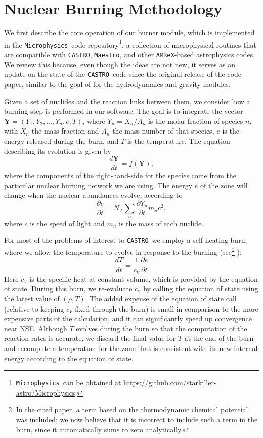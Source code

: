 \documentclass[twocolumn,numberedappendix]{../aastex62}
\newcommand{\amrex}{\texttt{AMReX}}
\newcommand{\castro}{\texttt{CASTRO}}
\newcommand{\maestro}{\texttt{Maestro}}
\newcommand{\microphysics}{\texttt{Microphysics}}
\begin{document}
\section{Nuclear Burning Methodology}
\label{sec:burner}

We first describe the core operation of our burner module, which is implemented in
the \microphysics\ code repository\footnote{\microphysics\ can be obtained at
  \url{https://github.com/starkiller-astro/Microphysics}.}, a collection of microphysical
routines that are compatible with \castro, \maestro, and other \amrex-based astrophysics
codes. We review this because, even though the ideas are not new,
it serves as an update on the state of the \castro\ code since the original release of
the code paper, similar to the goal of \cite{wdmergerI} for the hydrodynamics and gravity
modules.

Given a set of nuclides and the reaction links between them, we consider
how a burning step is performed in our software. The goal is to integrate the
vector ${\bm{Y}} = (Y_1, Y_2, \ldots, Y_n, e, T)$, where $Y_{n} = X_{n} / A_{n}$
is the molar fraction of species $n$, with $X_n$ the mass fraction and $A_n$ the
mass number of that species, $e$ is the energy released during the burn, and
$T$ is the temperature. The equation describing its evolution is given by
\begin{equation}
  \frac{d\bm{Y}}{dt} = f(\mathbf{Y}),
\end{equation}
where the components of the right-hand-side for the species come from the particular
nuclear burning network we are using. The energy $e$ of the zone
will change when the nuclear abundances evolve, according to
\begin{equation}
  \frac{\partial e}{\partial t} = N_A \sum_{n} \frac{\partial Y_{n}}{\partial t} m_{n} c^2,
\end{equation}
where $c$ is the speed of light and $m_n$ is the mass of each nuclide.

For most of the problems of interest to \castro\, we employ a self-heating burn,
where we allow the temperature to evolve in response
to the burning (see\footnote{In the cited paper, a term based on the
thermodynamic chemical potential was included; we now believe
that it is incorrect to include such a term in the burn, since it
automatically sums to zero analytically.} \citet{maestro3}):
\begin{equation}
  \frac{dT}{dt} = \frac{1}{c_V}\frac{\partial e}{\partial t}
\end{equation}
Here $c_V$ is the specific heat at constant volume, which
is provided by the equation of state. During this burn, we re-evaluate $c_V$
by calling the equation of state using the latest value of $(\rho, T)$.
The added expense of the equation of state call (relative to keeping $c_V$ fixed
through the burn) is small in comparison to the more expensive parts of the calculation,
and it can significantly speed up convergence near NSE. Although $T$ evolves during the
burn so that the computation of the reaction rates is accurate, we discard the final value
for $T$ at the end of the burn and recompute a temperature for the zone that is consistent
with its new internal energy according to the equation of state.
\end{document}
